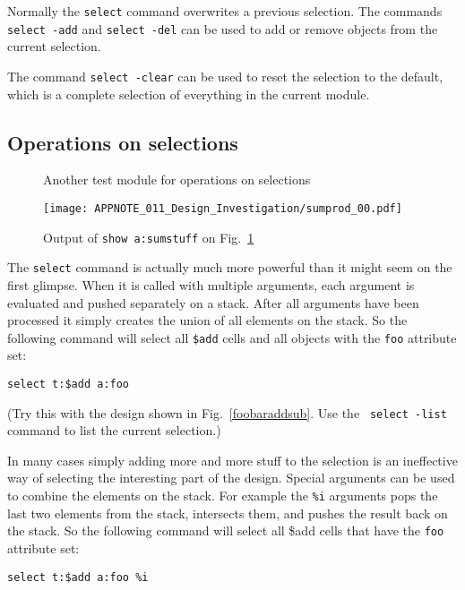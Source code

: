 \documentclass[9pt,technote,a4paper]{IEEEtran}
\begin{document}
Normally the {\tt select} command overwrites a previous selection. The
commands {\tt select -add} and {\tt select -del} can be used to add
or remove objects from the current selection.

The command {\tt select -clear} can be used to reset the selection to the
default, which is a complete selection of everything in the current module.

\subsection{Operations on selections}

\begin{figure}[t]

\caption{Another test module for operations on selections}
\label{sumprod}
\end{figure}

\begin{figure}[b]
\texttt{[image: APPNOTE\_011\_Design\_Investigation/sumprod\_00.pdf]}
\caption{Output of {\tt show a:sumstuff} on Fig.~\ref{sumprod}}
\label{sumprod_00}
\end{figure}

The {\tt select} command is actually much more powerful than it might seem on
the first glimpse. When it is called with multiple arguments, each argument is
evaluated and pushed separately on a stack. After all arguments have been
processed it simply creates the union of all elements on the stack. So the
following command will select all {\tt \$add} cells and all objects with
the {\tt foo} attribute set:

\begin{verbatim}
select t:$add a:foo
\end{verbatim}

(Try this with the design shown in Fig.~\ref{foobaraddsub}. Use the {\tt
select -list} command to list the current selection.)

In many cases simply adding more and more stuff to the selection is an
ineffective way of selecting the interesting part of the design. Special
arguments can be used to combine the elements on the stack.
For example the {\tt \%i} arguments pops the last two elements from
the stack, intersects them, and pushes the result back on the stack. So the
following command will select all {\$add} cells that have the {\tt foo}
attribute set:

\begin{verbatim}
select t:$add a:foo %i
\end{verbatim}
\end{document}
